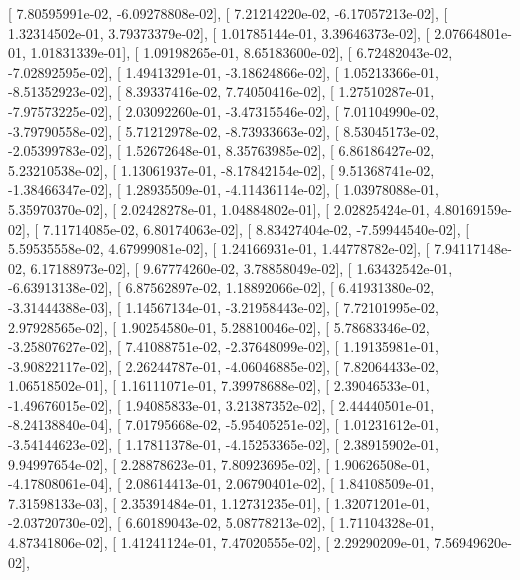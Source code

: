\documentclass{article}
\begin{document}
       [  7.80595991e-02,  -6.09278808e-02],
       [  7.21214220e-02,  -6.17057213e-02],
       [  1.32314502e-01,   3.79373379e-02],
       [  1.01785144e-01,   3.39646373e-02],
       [  2.07664801e-01,   1.01831339e-01],
       [  1.09198265e-01,   8.65183600e-02],
       [  6.72482043e-02,  -7.02892595e-02],
       [  1.49413291e-01,  -3.18624866e-02],
       [  1.05213366e-01,  -8.51352923e-02],
       [  8.39337416e-02,   7.74050416e-02],
       [  1.27510287e-01,  -7.97573225e-02],
       [  2.03092260e-01,  -3.47315546e-02],
       [  7.01104990e-02,  -3.79790558e-02],
       [  5.71212978e-02,  -8.73933663e-02],
       [  8.53045173e-02,  -2.05399783e-02],
       [  1.52672648e-01,   8.35763985e-02],
       [  6.86186427e-02,   5.23210538e-02],
       [  1.13061937e-01,  -8.17842154e-02],
       [  9.51368741e-02,  -1.38466347e-02],
       [  1.28935509e-01,  -4.11436114e-02],
       [  1.03978088e-01,   5.35970370e-02],
       [  2.02428278e-01,   1.04884802e-01],
       [  2.02825424e-01,   4.80169159e-02],
       [  7.11714085e-02,   6.80174063e-02],
       [  8.83427404e-02,  -7.59944540e-02],
       [  5.59535558e-02,   4.67999081e-02],
       [  1.24166931e-01,   1.44778782e-02],
       [  7.94117148e-02,   6.17188973e-02],
       [  9.67774260e-02,   3.78858049e-02],
       [  1.63432542e-01,  -6.63913138e-02],
       [  6.87562897e-02,   1.18892066e-02],
       [  6.41931380e-02,  -3.31444388e-03],
       [  1.14567134e-01,  -3.21958443e-02],
       [  7.72101995e-02,   2.97928565e-02],
       [  1.90254580e-01,   5.28810046e-02],
       [  5.78683346e-02,  -3.25807627e-02],
       [  7.41088751e-02,  -2.37648099e-02],
       [  1.19135981e-01,  -3.90822117e-02],
       [  2.26244787e-01,  -4.06046885e-02],
       [  7.82064433e-02,   1.06518502e-01],
       [  1.16111071e-01,   7.39978688e-02],
       [  2.39046533e-01,  -1.49676015e-02],
       [  1.94085833e-01,   3.21387352e-02],
       [  2.44440501e-01,  -8.24138840e-04],
       [  7.01795668e-02,  -5.95405251e-02],
       [  1.01231612e-01,  -3.54144623e-02],
       [  1.17811378e-01,  -4.15253365e-02],
       [  2.38915902e-01,   9.94997654e-02],
       [  2.28878623e-01,   7.80923695e-02],
       [  1.90626508e-01,  -4.17808061e-04],
       [  2.08614413e-01,   2.06790401e-02],
       [  1.84108509e-01,   7.31598133e-03],
       [  2.35391484e-01,   1.12731235e-01],
       [  1.32071201e-01,  -2.03720730e-02],
       [  6.60189043e-02,   5.08778213e-02],
       [  1.71104328e-01,   4.87341806e-02],
       [  1.41241124e-01,   7.47020555e-02],
       [  2.29290209e-01,   7.56949620e-02],
\end{document}
